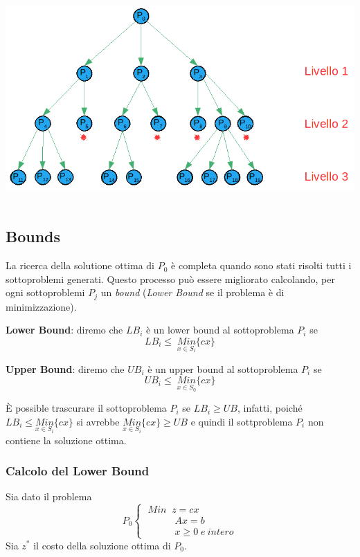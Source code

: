 \begin{center}
	\includegraphics[height=8cm]{images/graph18.png}
\end{center}

\subsection{Bounds}
La ricerca della solutione ottima di $P_{0}$ è completa quando sono stati risolti tutti i sottoproblemi generati.\newline
Questo processo può essere migliorato calcolando, per ogni sottoproblemi $P_{j}$ un \textit{bound} (\textit{Lower Bound} se il problema è di minimizzazione).

\textbf{Lower Bound}: diremo che $LB_{i}$ è un lower bound al sottoproblema $P_{i}$ se
\begin{equation}
LB_{i}\le\;\underset{x\in S_{i}}{Min}\{cx\}
\end{equation}

\textbf{Upper Bound}: diremo che $UB_{i}$ è un upper bound al sottoproblema $P_{i}$ se
\begin{equation}
UB_{i}\le\;\underset{x\in S_{0}}{Min}\{cx\}
\end{equation}

È possible trascurare il sottoproblema $P_{i}$ se $LB_{i}\ge UB$, infatti, poiché $LB_{i}\le \underset{x\in S_{i}}{Min}\{cx\}$ si avrebbe $\underset{x\in S_{i}}{Min}\{cx\}\ge UB$ e quindi il sottproblema $P_{i}$ non contiene la soluzione ottima.

\subsubsection{Calcolo del Lower Bound}
Sia dato il problema
\begin{displaymath}
P_{0}
\begin{cases}
\;Min\;\;z=cx\\
\;\;\;\;\;\;\;\;\;\;\;A x = b\\
\;\;\;\;\;\;\;\;\;\;\;x \ge 0\;e\:intero
\end{cases}
\end{displaymath}
Sia $z^{*}$ il costo della soluzione ottima di $P_{0}$.

